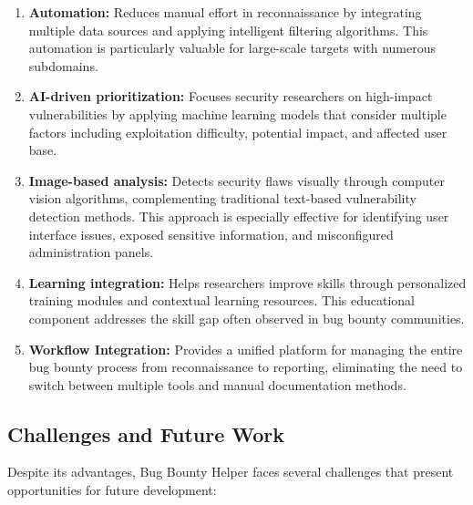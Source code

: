 \documentclass[conference]{IEEEtran}
\begin{document}
\begin{enumerate}
    \item \textbf{Automation:} Reduces manual effort in reconnaissance by integrating multiple data sources and applying intelligent filtering algorithms. This automation is particularly valuable for large-scale targets with numerous subdomains.
    
    \item \textbf{AI-driven prioritization:} Focuses security researchers on high-impact vulnerabilities by applying machine learning models that consider multiple factors including exploitation difficulty, potential impact, and affected user base.
    
    \item \textbf{Image-based analysis:} Detects security flaws visually through computer vision algorithms, complementing traditional text-based vulnerability detection methods. This approach is especially effective for identifying user interface issues, exposed sensitive information, and misconfigured administration panels.
    
    \item \textbf{Learning integration:} Helps researchers improve skills through personalized training modules and contextual learning resources. This educational component addresses the skill gap often observed in bug bounty communities.
    
    \item \textbf{Workflow Integration:} Provides a unified platform for managing the entire bug bounty process from reconnaissance to reporting, eliminating the need to switch between multiple tools and manual documentation methods.
\end{enumerate}

\subsection{Challenges and Future Work}
Despite its advantages, Bug Bounty Helper faces several challenges that present opportunities for future development:
\end{document}
